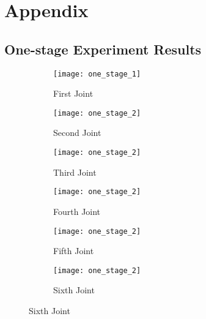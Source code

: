 \chapter*{Appendix}
\renewcommand{\thefigure}{A.\arabic{figure}}
\setcounter{figure}{0}  
\section*{One-stage Experiment Results}
\begin{figure}[H]
  \caption{Optimization using dynamic friction}
  \begin{subfigure}[t]{0.5\textwidth}
    \centering
    \texttt{[image: one\_stage\_1]} 
    \caption{First Joint}
  \end{subfigure}
  \begin{subfigure}[t]{0.5\textwidth}
    \centering
    \texttt{[image: one\_stage\_2]}
    \caption{Second Joint}
  \end{subfigure}
  \begin{subfigure}[t]{0.5\textwidth}
    \centering
    \texttt{[image: one\_stage\_2]}
    \caption{Third Joint}
  \end{subfigure}
  \begin{subfigure}[t]{0.5\textwidth}
    \centering
    \texttt{[image: one\_stage\_2]}
    \caption{Fourth Joint}
  \end{subfigure}
  \begin{subfigure}[t]{0.5\textwidth}
    \centering
    \texttt{[image: one\_stage\_2]}
    \caption{Fifth Joint}
  \end{subfigure}
  \begin{subfigure}[t]{0.5\textwidth}
    \centering
    \texttt{[image: one\_stage\_2]}
    \caption{Sixth Joint}
  \end{subfigure}
\end{figure}

